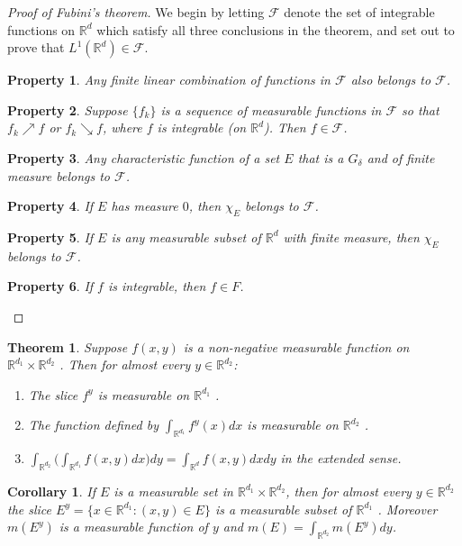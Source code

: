 \documentclass{report}
\theoremstyle{upthm}
\newtheorem{thm}{Theorem}
\newtheorem{cor}{Corollary}
\newtheorem{property}{Property}
\newcommand{\reals}{\mathbb{R}}
\newcommand{\calF}{{\mathcal{F}}}
\newcommand{\set}[1]{\big\lbrace #1 \big\rbrace}
\begin{document}
\begin{proof}[Proof of Fubini's theorem]
	We begin by letting $\calF$ denote the set of integrable functions on $\reals^d$ which satisfy all three conclusions in the theorem, and set out to prove that $L^1(\reals^d) \in \calF$.
	\begin{property}
		Any finite linear combination of functions in $\calF$ also belongs to $\calF$.
	\end{property}
	\begin{property}
		Suppose $\set{f_k}$ is a sequence of measurable functions in $\calF$ so that $f_k \nearrow f$ or $f_k \searrow f$, where $f$ is integrable (on $\reals^d$). Then $f \in \calF$.
	\end{property}
	\begin{property}
		Any characteristic function of a set $E$ that is a $G_\delta$ and of finite measure belongs to $\calF$.
	\end{property}
	\begin{property}
		If $E$ has measure $0$, then $\chi_E$ belongs to $\calF$.
	\end{property}
	\begin{property}
		If $E$ is any measurable subset of $\reals^d$ with finite measure, then $\chi_E$ belongs to $\calF$.
	\end{property}
	\begin{property}
		If $f$ is integrable, then $f \in F$.
	\end{property}
\end{proof}

\begin{thm}
	Suppose $f(x, y)$ is a non-negative measurable function on $\reals^{d_1} \times \reals^{d_2}$ . Then for almost every $y \in \reals^{d_2}$:
	\begin{enumerate}
		\item The slice $f^y$ is measurable on $\reals^{d_1}$ .
		\item The function defined by $\int_{\reals^{d_1}} f^y(x) dx$ is measurable on $\reals^{d_2}$ .
		\item $\int_{\reals^{d_2}} \big( \int_{\reals^{d_1}} f(x, y) dx  \big) dy = \int_{\reals^d} f(x,y) dxdy$ in the extended sense.
	\end{enumerate}	
\end{thm}

\begin{cor}
	If $E$ is a measurable set in $\reals^{d_1} \times \reals^{d_2}$, then for almost every $y \in \reals^{d_2}$ the slice $E^y = \set{x \in \reals^{d_1}: (x, y) \in E}$ is a measurable subset of $\reals^{d_1}$ . Moreover $m(E^y)$ is a measurable function
	of $y$ and $m(E) = \int_{\reals^{d_2}} m(E^y) dy$.
\end{cor}
\end{document}
